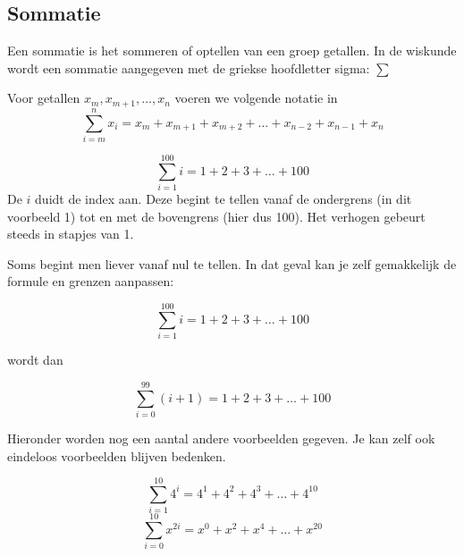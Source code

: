 \subsection{Sommatie}

Een sommatie is het sommeren of optellen van een groep getallen. 
In de wiskunde wordt een sommatie aangegeven met de griekse hoofdletter sigma: $\sum$ 

\begin{notatie}
Voor getallen $x_m,x_{m+1},\ldots,x_n$ voeren we volgende notatie in
\begin{equation*}
\sum_{i=m}^{n}x_i = x_m + x_{m+1} + x_{m+2} + \ldots + x_{n-2} + x_{n-1} + x_{n}
\end{equation*}	
\end{notatie}

\begin{voorbeeld}
	\begin{equation*}
	\sum_{i=1}^{100}i = 1+2+3+\ldots+100
	\end{equation*}
	De $i$ duidt de index aan. Deze begint te tellen vanaf de ondergrens (in dit voorbeeld 1) tot en met de bovengrens (hier dus 100). Het verhogen gebeurt steeds in stapjes van 1.
	
\end{voorbeeld}

\begin{voorbeeld}
	Soms begint men liever vanaf nul te tellen. In dat geval kan je zelf gemakkelijk de formule en grenzen aanpassen:
	
		\begin{equation*}
	\sum_{i=1}^{100}i = 1+2+3+\ldots+100
	\end{equation*}
	
wordt dan

	\begin{equation*}
\sum_{i=0}^{99} (i+1) = 1+2+3+\ldots+100
\end{equation*}

\end{voorbeeld}

Hieronder worden nog een aantal andere voorbeelden gegeven. Je kan zelf ook eindeloos voorbeelden blijven bedenken.

\begin{voorbeeld}
	\begin{equation*}
	\sum_{i=1}^{10} 4^i = 4^1+4^2+4^3+\ldots+4^{10}
	\end{equation*}
	\begin{equation*}
	\sum_{i=0}^{10} x^{2i} = x^0+x^2+x^4+\ldots+x^{20}
	\end{equation*}
\end{voorbeeld}

